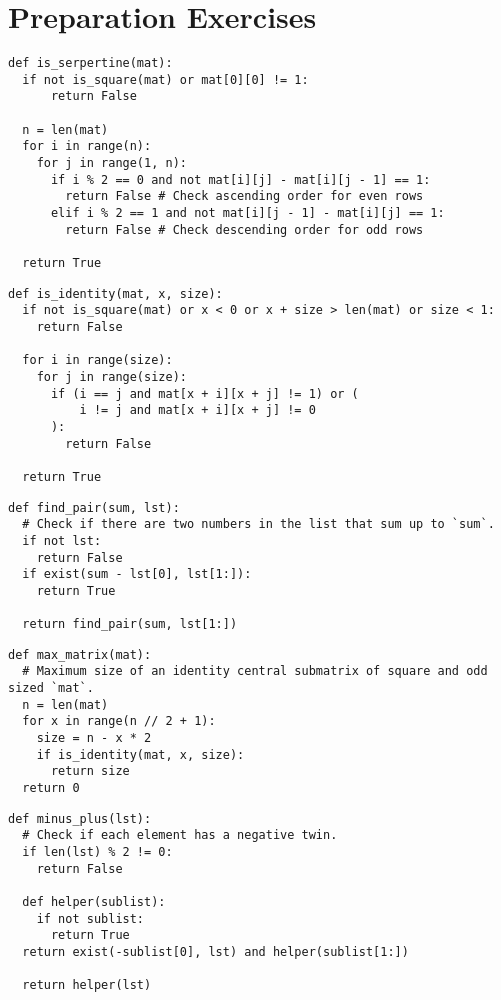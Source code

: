\documentclass[11pt]{article}
\begin{document}
\section{Preparation Exercises}
\begin{lstlisting}
def is_serpertine(mat):
  if not is_square(mat) or mat[0][0] != 1:
      return False

  n = len(mat)
  for i in range(n):
    for j in range(1, n):
      if i % 2 == 0 and not mat[i][j] - mat[i][j - 1] == 1: 
        return False # Check ascending order for even rows
      elif i % 2 == 1 and not mat[i][j - 1] - mat[i][j] == 1:  
        return False # Check descending order for odd rows

  return True
\end{lstlisting}
\begin{lstlisting}
def is_identity(mat, x, size):
  if not is_square(mat) or x < 0 or x + size > len(mat) or size < 1:
    return False

  for i in range(size):
    for j in range(size):
      if (i == j and mat[x + i][x + j] != 1) or (
          i != j and mat[x + i][x + j] != 0
      ):
        return False

  return True
\end{lstlisting}

\begin{multicols}{2}
\begin{lstlisting}
def find_pair(sum, lst):
  # Check if there are two numbers in the list that sum up to `sum`.
  if not lst:
    return False
  if exist(sum - lst[0], lst[1:]):
    return True

  return find_pair(sum, lst[1:])
\end{lstlisting}
\begin{lstlisting}
def max_matrix(mat):
  # Maximum size of an identity central submatrix of square and odd sized `mat`.
  n = len(mat)
  for x in range(n // 2 + 1):
    size = n - x * 2
    if is_identity(mat, x, size):
      return size
  return 0
\end{lstlisting}
\end{multicols}

\begin{lstlisting}
def minus_plus(lst):
  # Check if each element has a negative twin.
  if len(lst) % 2 != 0:
    return False

  def helper(sublist):
    if not sublist:
      return True
  return exist(-sublist[0], lst) and helper(sublist[1:])

  return helper(lst)
\end{lstlisting}
\end{document}
